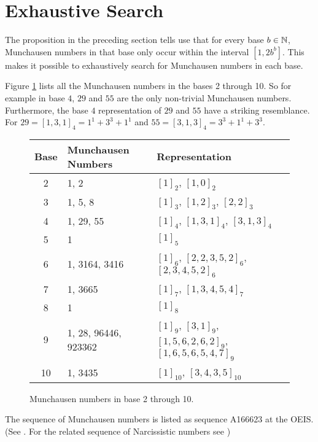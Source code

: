 \section*{Exhaustive Search}

The proposition in the preceding section tells use that for every base 
$b \in \mathbb{N}$, Munchausen numbers in that base only occur within the interval 
$[1,2b^{b}]$. This makes it possible to exhaustively search for Munchausen 
numbers in each base.

Figure \ref{figure:munchausen} lists all the Munchausen numbers in the bases 2
through 10. So for example in base $4$, $29$ and $55$ are the only non-trivial
Munchausen numbers. Furthermore, the base $4$ representation of $29$ and $55$
have a striking resemblance. For $29 = [1,3,1]_{4} = 1^{1} + 3^{3} + 1^{1}$ and
$55 = [3,1,3]_{4} = 3^{3} + 1^{1} + 3^{3}$.

\begin{figure}[th]
	\begin{center}
		\caption{Munchausen numbers in base 2 through 10.}
		\label{figure:munchausen}
		\begin{tabular}{|c|l|l|}
			\hline
			Base & Munchausen Numbers & Representation \\
			\hline
			2  & 1, 2                 & {\small$[1]_{2}$, $[1,0]_{2}$} \\
			3  & 1, 5, 8              & {\small$[1]_{3}$, $[1,2]_{3}$, $[2,2]_{3}$} \\
			4  & 1, 29, 55            & {\small$[1]_{4}$, $[1,3,1]_{4}$, $[3,1,3]_{4}$} \\
			5  & 1                    & {\small$[1]_{5}$} \\
			6  & 1, 3164, 3416        & {\small$[1]_{6}$, $[2,2,3,5,2]_{6}$, $[2,3,4,5,2]_{6}$} \\
			7  & 1, 3665              & {\small$[1]_{7}$, $[1,3,4,5,4]_{7}$} \\
			8  & 1                    & {\small$[1]_{8}$} \\
			9  & 1, 28, 96446, 923362 & {\small$[1]_{9}$, $[3,1]_{9}$, $[1,5,6,2,6,2]_{9}$, $[1,6,5,6,5,4,7]_{9}$} \\
			10 & 1, 3435              & {\small$[1]_{10}$, $[3,4,3,5]_{10}$} \\
			\hline
		\end{tabular}
	\end{center}
\end{figure}

The sequence of Munchausen numbers is listed as sequence A166623 at the OEIS. 
(See \cite{oeis:munchausen}. For the related sequence of Narcissistic numbers see
\cite{oeis:narcissistic})

